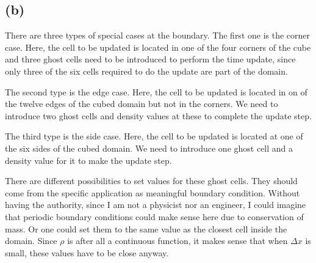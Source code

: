 \subsection*{(b)} There are three types of special cases at the boundary. The first one is the corner case. Here, the cell to be updated is located in one of the four corners of the cube and three ghost cells need to be introduced to perform the time update, since only three of the six cells required to do the update are part of the domain.

The second type is the edge case. Here, the cell to be updated is located in on of the twelve edges of the cubed domain but not in the corners. We need to introduce two ghost cells and density values at these to complete the update step.

The third type is the side case. Here, the cell to be updated is located at one of the six sides of the cubed domain. We need to introduce one ghost cell and a density value for it to make the update step.

There are different possibilities to set values for these ghost cells. They should come from the specific application as meaningful boundary condition. Without having the authority, since I am not a physicist nor an engineer, I could imagine that periodic boundary conditions could make sense here due to conservation of mass. Or one could set them to the same value as the closest cell inside the domain. Since $\rho$ is after all a continuous function, it makes sense that when $\Delta x$ is small, these values have to be close anyway.
